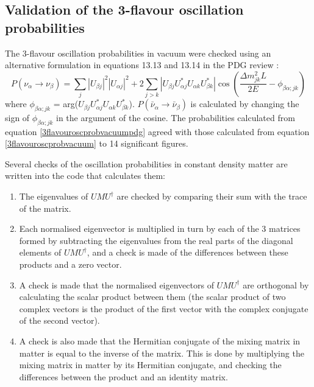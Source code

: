 \clearpage

\subsection{Validation of the 3-flavour oscillation probabilities}
\label{sec:3flavourvalidation}

The 3-flavour oscillation probabilities in vacuum were checked using an alternative formulation in equations 13.13 and 13.14 
in the PDG review \cite{PDG2012}:
\begin{equation}
P(\nu_{\alpha} \rightarrow \nu_{\beta}) = \sum_{j} |U_{\beta j}|^{2} |U_{\alpha j}|^{2} + 2 \sum_{j>k} |U_{\beta j} U_{\alpha j}^{*} U_{\alpha k} U_{\beta k}^{*}| 
\cos \left(\frac{\Delta m_{jk}^{2} L}{2E}  - \phi_{\beta \alpha;jk}  \right)
\label{3flavouroscprobvacuumpdg}
\end{equation}
where $\phi_{\beta \alpha;jk}$ = arg($U_{\beta j} U_{\alpha j}^{*} U_{\alpha k} U_{\beta k}^{*}$). $P(\bar{\nu}_{\alpha} \rightarrow \bar{\nu}_{\beta})$ 
is calculated by changing the sign of $\phi_{\beta \alpha;jk}$ in the argument of the cosine. The probabilities calculated from equation \ref{3flavouroscprobvacuumpdg} 
agreed with those calculated from equation \ref{3flavouroscprobvacuum} to 14 significant figures.

Several checks of the oscillation probabilities in constant density matter are written into the code that calculates them: 
\begin{enumerate}
\item The eigenvalues of $U M U^{\dagger}$ are checked by comparing their sum with the trace of the matrix. 
\item Each normalised eigenvector is multiplied in turn by each of the 3 matrices formed by subtracting the eigenvalues from the real parts of the 
diagonal elements of $U M U^{\dagger}$, and a check is made of the differences between these products and a zero vector. 
\item A check is made that the normalised eigenvectors of $U M U^{\dagger}$ are orthogonal by calculating the scalar product between them (the scalar product of two 
complex vectors is the product of the first vector with the complex conjugate of the second vector). 
\item A check is also made that the Hermitian conjugate of the mixing matrix in matter is equal to the inverse of the matrix. This is done by multiplying the 
mixing matrix in matter by its Hermitian conjugate, and checking the differences between the product and an identity matrix.
\end{enumerate}


